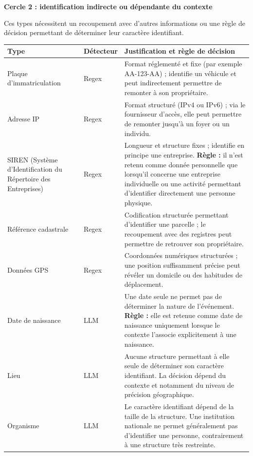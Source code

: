 \documentclass[12pt,a4paper]{article}
\begin{document}
\medskip
\noindent\textbf{Cercle 2 : identification indirecte ou dépendante du contexte}

\smallskip

Ces types nécessitent un recoupement avec d'autres informations ou une règle
de décision permettant de déterminer leur caractère identifiant.

\begin{longtable}{
    p{3.2cm}
    @{\hspace{0.4cm}}
    p{1.8cm}
    @{\hspace{0.4cm}}
    p{8.5cm}
}
\toprule
\textbf{Type} & \textbf{Détecteur} & \textbf{Justification et règle de décision} \\
\midrule
\endhead

Plaque d'immatriculation
& Regex
& Format réglementé et fixe (par exemple AA-123-AA) ; identifie un véhicule
et peut indirectement permettre de remonter à son propriétaire. \\

Adresse IP
& Regex
& Format structuré (IPv4 ou IPv6) ; via le fournisseur d'accès, elle peut
permettre de remonter jusqu'à un foyer ou un individu. \\

SIREN (Système d’Identification du Répertoire des Entreprises)
& Regex
& Longueur et structure fixes ; identifie en principe une entreprise.
\textbf{Règle :} il n'est retenu comme donnée personnelle que lorsqu'il
concerne une entreprise individuelle ou une activité permettant d'identifier
directement une personne physique. \\

Référence cadastrale
& Regex
& Codification structurée permettant d'identifier une parcelle ; le
recoupement avec des registres peut permettre de retrouver son propriétaire. \\

Données GPS
& Regex
& Coordonnées numériques structurées ; une position suffisamment précise
peut révéler un domicile ou des habitudes de déplacement. \\

Date de naissance
& LLM
& Une date seule ne permet pas de déterminer la nature de l'événement.
\textbf{Règle :} elle est retenue comme date de naissance uniquement lorsque
le contexte l'associe explicitement à une naissance. \\

Lieu
& LLM
& Aucune structure permettant à elle seule de déterminer son caractère
identifiant. La décision dépend du contexte et notamment du niveau de
précision géographique. \\

Organisme
& LLM
& Le caractère identifiant dépend de la taille de la structure. Une
institution nationale ne permet généralement pas d'identifier une personne,
contrairement à une structure très restreinte. \\

\bottomrule
\end{longtable}
\end{document}
